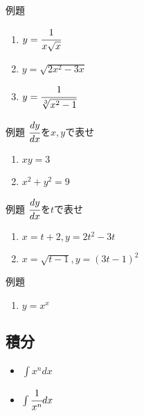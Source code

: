 \documentclass[10pt,dvipdfmx]{jsarticle}
\begin{document}
\begin{itembox}[l]{例題}
  \begin{large}
    \begin{enumerate}
      \item $y=\cfrac{1}{x\sqrt{x}}$
      \item $y=\sqrt{2x^2-3x}$
      \item $y=\cfrac{1}{\sqrt[3]{x^2-1}}$
    \end{enumerate}
  \end{large}
\end{itembox}

\begin{itembox}[l]{例題}
  $\cfrac{dy}{dx}$を$x,y$で表せ
  \begin{large}
    \begin{enumerate}
      \item $xy=3$
      \item $x^2+y^2=9$
    \end{enumerate}
  \end{large}
\end{itembox}

\begin{itembox}[l]{例題}
  $\cfrac{dy}{dx}$を$t$で表せ
  \begin{large}
    \begin{enumerate}
      \item $x=t+2, y=2t^2-3t$
      \item $x=\sqrt{t-1}, y=(3t-1)^2$
    \end{enumerate}
  \end{large}
\end{itembox}

\begin{itembox}[l]{例題}
  \begin{large}
    \begin{enumerate}
      \item $y=x^x$
    \end{enumerate}
  \end{large}
\end{itembox}


\newpage
\subsection*{積分}
\begin{multicols}{2}
  \begin{Large}
    \begin{itemize}
      \item $\int x^n dx$
      \item $\int \cfrac{1}{x^n} dx$
    \end{itemize}
  \end{Large}
\end{multicols}
\end{document}
